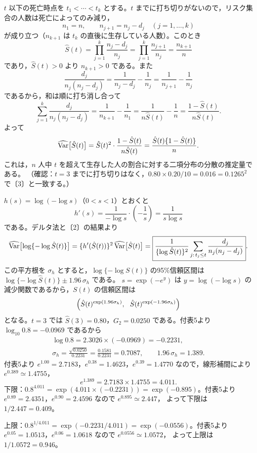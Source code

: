 \documentclass[a4paper,11pt]{ltjsarticle}
\begin{document}
$t$ 以下の死亡時点を $t_1<\cdots<t_k$ とする。$t$ までに打ち切りがないので，リスク集合の人数は死亡によってのみ減り，
\[
n_1=n,\qquad n_{j+1}=n_j-d_j\quad(j=1,\ldots,k)
\]
が成り立つ（$n_{k+1}$ は $t_k$ の直後に生存している人数）。このとき
\[
\hat S(t)=\prod_{j=1}^k\frac{n_j-d_j}{n_j}=\prod_{j=1}^k\frac{n_{j+1}}{n_j}=\frac{n_{k+1}}{n}
\]
であり，$\hat S(t)>0$ より $n_{k+1}>0$ である。また
\[
\frac{d_j}{n_j(n_j-d_j)}=\frac{1}{n_j-d_j}-\frac{1}{n_j}=\frac{1}{n_{j+1}}-\frac{1}{n_j}
\]
であるから，和は順に打ち消し合って
\[
\sum_{j=1}^k\frac{d_j}{n_j(n_j-d_j)}=\frac{1}{n_{k+1}}-\frac{1}{n_1}=\frac{1}{n\hat S(t)}-\frac1n=\frac{1-\hat S(t)}{n\hat S(t)}.
\]
よって
\[
\widehat{\operatorname{Var}}\bigl[\hat S(t)\bigr]=\hat S(t)^2\cdot\frac{1-\hat S(t)}{n\hat S(t)}=\frac{\hat S(t)\{1-\hat S(t)\}}{n}.
\]
これは，$n$ 人中 $t$ を超えて生存した人の割合に対する二項分布の分散の推定量である。
（確認：$t=3$ までに打ち切りはなく，$0.80\times0.20/10=0.016=0.1265^2$ で〔3〕と一致する。）

$h(s)=\log(-\log s)$（$0<s<1$）とおくと
\[
h'(s)=\frac{1}{-\log s}\cdot\left(-\frac1s\right)=\frac{1}{s\log s}
\]
である。デルタ法と〔2〕の結果より
\[
\widehat{\operatorname{Var}}\bigl[\log\{-\log\hat S(t)\}\bigr]=\{h'(\hat S(t))\}^2\,\widehat{\operatorname{Var}}\bigl[\hat S(t)\bigr]
=\boxed{\frac{1}{\{\log\hat S(t)\}^2}\sum_{j:\,t_j\le t}\frac{d_j}{n_j(n_j-d_j)}}.
\]
この平方根を $\sigma_h$ とすると，$\log\{-\log S(t)\}$ の95\%信頼区間は $\log\{-\log\hat S(t)\}\pm1.96\,\sigma_h$ である。
$s=\exp(-e^{y})$ は $y=\log(-\log s)$ の減少関数であるから，$S(t)$ の信頼区間は
\[
\Bigl(\hat S(t)^{\exp(1.96\sigma_h)},\ \ \hat S(t)^{\exp(-1.96\sigma_h)}\Bigr)
\]
となる。$t=3$ では $\hat S(3)=0.80$，$G_2=0.0250$ である。付表5より $\log_{10}0.8=-0.0969$ であるから
\begin{gather*}
\log0.8=2.3026\times(-0.0969)=-0.2231,\\
\sigma_h=\frac{\sqrt{0.0250}}{0.2231}=\frac{0.1581}{0.2231}=0.7087,\qquad 1.96\,\sigma_h=1.389 .
\end{gather*}
付表5より $e^{1.00}=2.7183$，$e^{0.38}=1.4623$，$e^{0.39}=1.4770$ なので，線形補間により $e^{0.389}\simeq1.4755$，
\[
e^{1.389}=2.7183\times1.4755=4.011 .
\]
下限：$0.8^{4.011}=\exp(4.011\times(-0.2231))=\exp(-0.895)$。付表5より $e^{0.89}=2.4351$，$e^{0.90}=2.4596$ なので $e^{0.895}\simeq2.447$，
よって下限は $1/2.447=0.409$。

上限：$0.8^{1/4.011}=\exp(-0.2231/4.011)=\exp(-0.0556)$。付表5より $e^{0.05}=1.0513$，$e^{0.06}=1.0618$ なので $e^{0.0556}\simeq1.0572$，
よって上限は $1/1.0572=0.946$。
\end{document}
